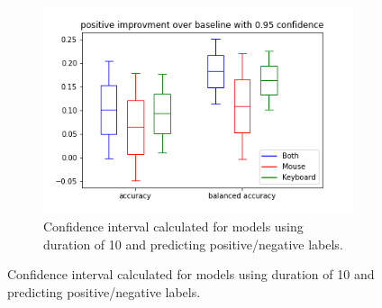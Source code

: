 \documentclass[../main.tex]{subfiles}
\begin{document}
\begin{figure}[!h]
\begin{subfigure}[b]{0.31\textwidth}
        \centering
        \includegraphics[width=\textwidth]{figures/results/interval_difference/10/10_positive_0.95.png}
        \captionsetup{justification=centering}
        \caption{Confidence interval calculated for models using duration of 10 and predicting positive/negative labels.}
    \end{subfigure}



\end{figure}
\end{document}
